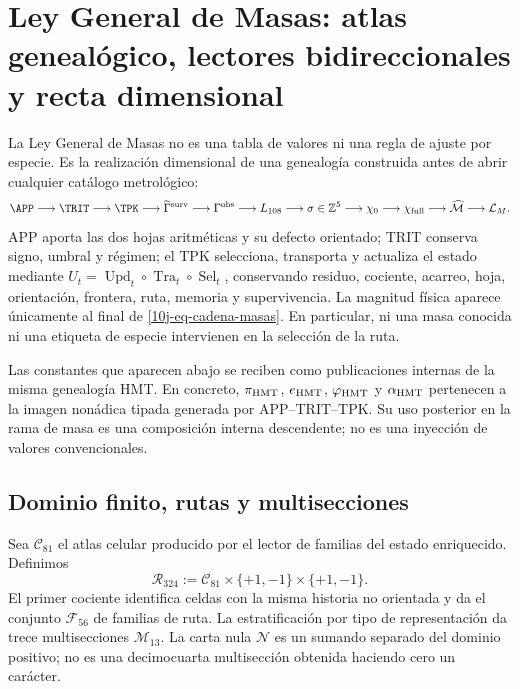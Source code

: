 \section{Ley General de Masas: atlas genealógico, lectores bidireccionales y recta dimensional}
\label{10j-sec-ley-general-masas}

La Ley General de Masas no es una tabla de valores ni una regla de ajuste por
especie. Es la realización dimensional de una genealogía construida antes de
abrir cualquier catálogo metrológico:
\begin{equation}
 \APP\longrightarrow\TRIT\longrightarrow\TPK
 \longrightarrow\widetilde\Gamma^{\rm surv}
 \longrightarrow\Gamma^{\rm obs}
 \longrightarrow L_{108}
 \longrightarrow\sigma\in\mathbb Z^5
 \longrightarrow\chi_0
 \longrightarrow\chi_{\rm full}
 \longrightarrow\widehat{\mathcal M}
 \longrightarrow\mathcal L_M .
 \label{10j-eq-cadena-masas}
\end{equation}
APP aporta las dos hojas aritméticas y su defecto orientado; TRIT conserva
signo, umbral y régimen; el TPK selecciona, transporta y actualiza el estado
mediante
\(
 U_t=\operatorname{Upd}_t\circ\operatorname{Tra}_t\circ
 \operatorname{Sel}_t
\), conservando residuo, cociente, acarreo, hoja, orientación, frontera,
ruta, memoria y supervivencia. La magnitud física aparece únicamente al final
de \eqref{10j-eq-cadena-masas}. En particular, ni una masa conocida ni una
etiqueta de especie intervienen en la selección de la ruta.

Las constantes que aparecen abajo se reciben como publicaciones internas de
la misma genealogía HMT. En concreto, \(\pi_{\rm HMT}\), \(e_{\rm HMT}\),
\(\varphi_{\rm HMT}\) y \(\alpha_{\rm HMT}\) pertenecen a la imagen nonádica
tipada generada por APP--TRIT--TPK. Su uso posterior en la rama de masa es una
composición interna descendente; no es una inyección de valores
convencionales.

\subsection{Dominio finito, rutas y multisecciones}

\begin{definition}
\label{10j-def-atlas}
Sea \(\mathcal C_{81}\) el atlas celular producido por el lector de familias
del estado enriquecido. Definimos
\begin{equation}
 \mathcal R_{324}:=
 \mathcal C_{81}\times\{+1,-1\}\times\{+1,-1\}.
 \label{10j-eq-rutas-324}
\end{equation}
El primer cociente identifica celdas con la misma historia no orientada y da
el conjunto \(\mathcal F_{56}\) de familias de ruta. La estratificación por
tipo de representación da trece multisecciones
\(\mathcal M_{13}\). La carta nula \(\mathcal N\) es un sumando separado del
dominio positivo; no es una decimocuarta multisección obtenida haciendo cero
un carácter.
\end{definition}

